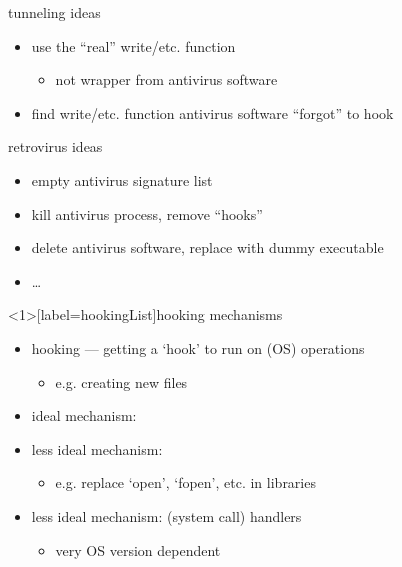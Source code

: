 \begin{frame}{tunneling ideas}
    \begin{itemize}
    \item use the ``real'' write/etc. function
        \begin{itemize}
        \item not wrapper from antivirus software
        \end{itemize}
    \item find write/etc. function antivirus software ``forgot'' to hook
    \end{itemize}
\end{frame}

\begin{frame}{retrovirus ideas}
    \begin{itemize}
    \item empty antivirus signature list
    \item kill antivirus process, remove ``hooks''
    \item delete antivirus software, replace with dummy executable
    \item \ldots
    \end{itemize}
\end{frame}

\begin{frame}<1>[label=hookingList]{hooking mechanisms}
    \begin{itemize}
    \item hooking --- getting a `hook' to run on (OS) operations
        \begin{itemize}
        \item e.g. creating new files
        \end{itemize}
    \item ideal mechanism: 
    \item less ideal mechanism: 
        \begin{itemize}
        \item e.g. replace `open', `fopen', etc. in libraries
        \end{itemize}
    \item less ideal mechanism:  (system call) handlers
        \begin{itemize}
        \item very OS version dependent
        \end{itemize} 
    \end{itemize}
\end{frame}


